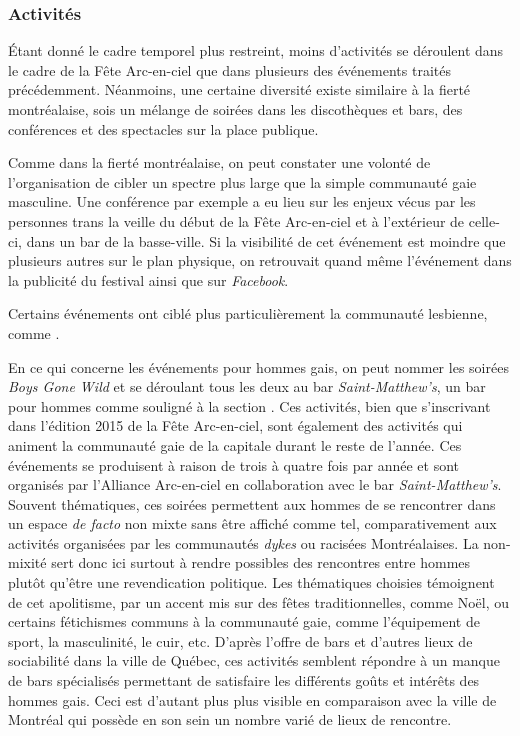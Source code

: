 \subsubsection{Activités}
\label{subsec:activitesfetearcenciel}
Étant donné le cadre temporel plus restreint, moins d'activités se déroulent dans le cadre de la Fête Arc-en-ciel que dans plusieurs des événements traités précédemment.
Néanmoins, une certaine diversité existe similaire à la fierté montréalaise, sois un mélange de soirées dans les discothèques et bars, des conférences et des spectacles sur la place publique.

Comme dans la fierté montréalaise, on peut constater une volonté de l'organisation de cibler un spectre plus large que la simple communauté gaie masculine.
Une conférence par exemple a eu lieu sur les enjeux vécus par les personnes trans la veille du début de la Fête Arc-en-ciel et à l'extérieur de celle-ci, dans un bar de la basse-ville.
Si la visibilité de cet événement est moindre que plusieurs autres sur le plan physique, on retrouvait quand même l'événement dans la publicité du festival ainsi que sur \emph{Facebook}.

Certains événements ont ciblé plus particulièrement la communauté lesbienne, comme .

En ce qui concerne les événements pour hommes gais, on peut nommer les soirées \emph{Boys Gone Wild} et  se déroulant tous les deux au bar \emph{Saint-Matthew's}, un bar pour hommes comme souligné à la section .
Ces activités, bien que s'inscrivant dans l'édition 2015 de la Fête Arc-en-ciel, sont également des activités qui animent la communauté gaie de la capitale durant le reste de l'année.
Ces événements se produisent à raison de trois à quatre fois par année et sont organisés par l'Alliance Arc-en-ciel en collaboration avec le bar \emph{Saint-Matthew's}.
Souvent thématiques, ces soirées permettent aux hommes de se rencontrer dans un espace \emph{de facto} non mixte sans être affiché comme tel, comparativement aux activités organisées par les communautés \emph{dykes} ou racisées Montréalaises.
La non-mixité sert donc ici surtout à rendre possibles des rencontres entre hommes plutôt qu'être une revendication politique.
Les thématiques choisies témoignent de cet apolitisme, par un accent mis sur des fêtes traditionnelles, comme Noël, ou certains fétichismes communs à la communauté gaie, comme l'équipement de sport, la masculinité, le cuir, etc.
D'après l'offre de bars et d'autres lieux de sociabilité dans la ville de Québec, ces activités semblent répondre à un manque de bars spécialisés permettant de satisfaire les différents goûts et intérêts des hommes gais.
Ceci est d'autant plus plus visible en comparaison avec la ville de Montréal qui possède en son sein un nombre varié de lieux de rencontre.

